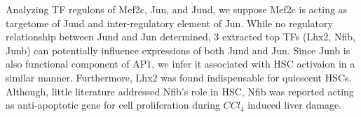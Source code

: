 \documentclass[fleqn,10pt]{wlscirep}
\begin{document}
\begin{itemize}
        Analyzing TF regulons of Mef2c, Jun, and Jund, we suppose Mef2c is acting as targetome of Jund and inter-regulatory element of Jun.
        While no regulatory relationship between Jund and Jun determined, 3 extracted top TFs (Lhx2, Nfib, Junb) can potentially influence expressions of both Jund and Jun.
        Since Junb is also functional component of AP1, we infer it associated with HSC activaion in a similar manner.
        Furthermore, Lhx2 was found indispensable for quiescent HSCs. \cite{lhx2_fibro, Lhx2_hsc_1}
        Although, little literature addressed Nfib's role in HSC, Nfib was reported acting as anti-apoptotic gene for cell proliferation during $CCl_4$ induced liver damage. \cite{Nfib_sadly}
    \end{itemize}

\end{document}

